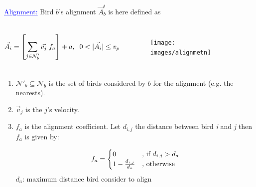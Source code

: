 \documentclass{beamer}
\begin{document}
\begin{frame}
\textcolor{blue}{\underline{Alignment:}}
Bird $b$'s alignment \(\vec{A}_b^i\) is here defined as %

\begin{columns}
\begin{align}
  \vec{A}_i = \left[\sum_{j \in \mathcal{N}'_b}{\vec{v_j}}\;f_a\right] + a, \;\;0 < |\vec{A}_i| \leq v_p \notag
  \label{eq:alignment}
\end{align}

\begin{figure}[h!]
		\texttt{[image: images/alignmetn]}
		\label{fig:vFOV}
\end{figure}	


\end{columns}

\begin{enumerate}
\item \(\mathcal{N}'_b \subseteq \mathcal{N}_b\) is the set of birds considered by $b$ for the alignment (e.g. the nearests).
\item \(\vec{v}_j\) is the $j$'s velocity.
\item \(f_a\) is the alignment coefficient. Let \(d_{i,j}\) the distance between bird \emph{i} and \emph{j} then \(f_a\) is given by:

\begin{equation*}
	f_a = \begin{cases}
	0 &\text{, if $ d_{i,j} > d_a$}\\
	1- \frac{d_{i,j}}{d_a} &\text{, otherwise} \notag
	\end{cases}
\end{equation*}
$d_a$: maximum distance bird consider to align 
\end{enumerate}
\end{frame}
\end{document}
